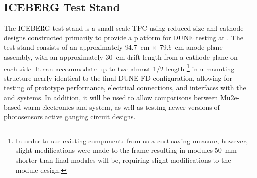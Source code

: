 


% 

\subsection{ICEBERG Test Stand}
\label{sec:iceberg-teststand}

The ICEBERG test-stand is a small-scale TPC using reduced-size   and cathode designs constructed primarily to provide a platform for DUNE  testing at . 
The test stand consists of an approximately \SI{94.7}{cm} $\times$ \SI{79.9}{cm} anode plane assembly, with an approximately \SI{30}{cm} drift length from a cathode plane on each side.  
It can accommodate up to two almost 1/2-length \footnote{In order to use existing  components from  as a cost-saving measure, however, slight modifications were made to the  frame resulting in  modules \SI{50}{mm} shorter than final modules will be, requiring slight modifications to the  module design.} in a mounting structure nearly identical to the final DUNE FD configuration, allowing for testing of  prototype performance, electrical connections, and interfaces with the  and  systems. 
In addition, it will be used to allow comparisons between Mu2e-based warm electronics and   system, as well as testing newer versions of photosensors active ganging circuit designs.


